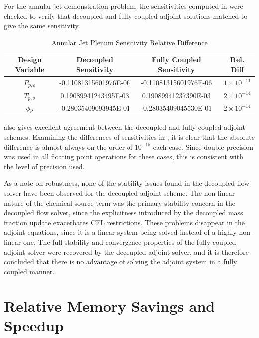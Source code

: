 For the annular jet demonstration problem, the sensitivities computed in
 were checked to verify that decoupled and fully
coupled adjoint solutions matched to give the same sensitivity.
\begin{table}[h]
  \centering
  \begin{tabular}{c|c|c|c}
    Design Variable & Decoupled Sensitivity & Fully Coupled Sensitivity & Rel. Diff\\
    \hline
    $P_{p,o}$ & -0.11081315601976E-06 & -0.11081315601976E-06 & $1 \times 10^{-11}$ \\
    $T_{p,o}$ &  0.19089941243495E-03 &  0.19089941237390E-03 & $2 \times 10^{-14}$ \\
    $\phi_p$     & -0.28035409093945E-01 & -0.28035409045530E-01 & $2 \times 10^{-14}$
  \end{tabular}
  \caption{Annular Jet Plenum Sensitivity Relative Difference}
  \label{tab:srp-adj-diff}
\end{table}
 also gives excellent agreement between the decoupled and
fully coupled adjoint schemes.  Examining the differences of sensitivities in
, it is clear
that the absolute difference is almost always on the order of $10^{-15}$ each
case.  Since double precision was used in all floating point operations for
these cases, this is consistent with the level of precision used.

As a note on robustness, none of the stability issues found in the decoupled
flow solver have been observed for the decoupled adjoint scheme.  The
non-linear nature of the chemical source term was the primary stability concern
in the decoupled flow solver, since the explicitness introduced by the decoupled
mass fraction update exacerbates CFL restrictions.  These problems disappear in
the adjoint equations, since it is a linear system being solved instead of a
highly non-linear one.  The full stability and convergence properties of the
fully coupled adjoint solver were recovered by the decoupled adjoint solver, and
it is therefore concluded that there is no advantage of solving the adjoint
system in a fully coupled manner.

\section{Relative Memory Savings and Speedup}
\label{sec:adj-cost-mem-savings}

